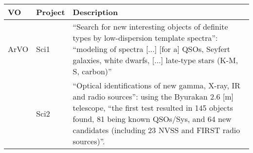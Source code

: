 \begin{table*}[h!t]
	\centering
	\begin{tabular}{|l|p{3cm}|p{12.5cm}|}
	\hline
	\textbf{VO} & \textbf{Project} & \textbf{Description}\\
	\hline
	\hline
	ArVO	& Sci1 & ``Search for new interesting objects of definite types by
low-dispersion template spectra'': ``modeling of spectra [...] [for a] QSOs,
							Seyfert galaxies, white dwarfs, [...] late-type stars (K-M, S, carbon)'' \\
			& Sci2 & ``Optical identifications of new gamma, X-ray, IR and radio
sources'': using the Byurakan 2.6 [m] telescope, ``the first test resulted in 145 
							objects found, 81 being known QSOs/Sys, and 64 new candidates (including 23 NVSS and FIRST radio sources)''.\\

\end{tabular}
\end{table*}
